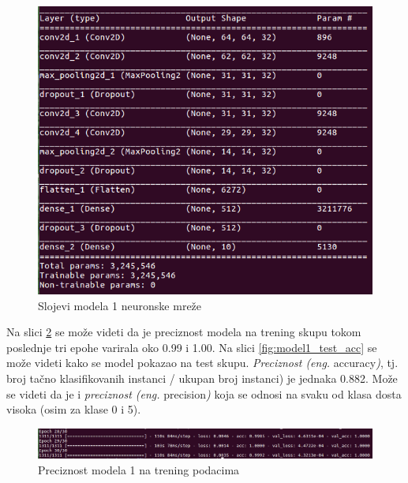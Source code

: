 \documentclass[a4paper]{article}
\begin{document}
\begin{figure}[h!]
\begin{center}
\includegraphics[scale=0.40]{model1_arhitektura.png}
\end{center}
\caption{Slojevi modela 1 neuronske mreže}
\label{fig:model1_arh}
\end{figure}

Na slici \ref{fig:model1_trening_acc} se može videti da je preciznost modela na trening skupu tokom poslednje tri epohe varirala oko 0.99 i 1.00. Na slici \ref{fig:model1_test_acc} se može videti kako se model pokazao na test skupu. \textit{Preciznost (eng.} accuracy\textit{)}, tj. broj tačno klasifikovanih instanci / ukupan broj instanci) je jednaka 0.882. Može se videti da je i \textit{preciznost (eng.} precision\textit{)} koja se odnosi na svaku od klasa dosta visoka (osim za klase 0 i 5).

\begin{figure}[h!]
\begin{center}
\includegraphics[scale=0.35]{model1_trening_acc.png}
\end{center}
\caption{Preciznost modela 1 na trening podacima}
\label{fig:model1_trening_acc}
\end{figure}
\end{document}

